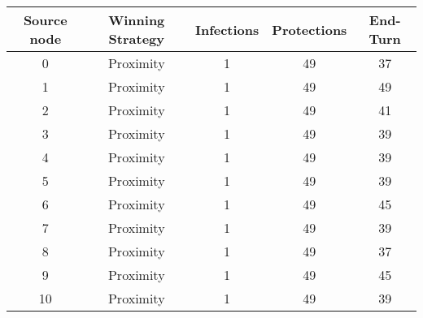 \documentclass[results.tex]{subfiles}
\begin{document}
    \begin{center}
        \begin{tabular}{| c || c | c | c | c |}
            \hline
            {\bfseries Source node} & {\bfseries Winning Strategy} & {\bfseries Infections} & {\bfseries Protections}
            & {\bfseries End-Turn}
            \\  %
            \hline\hline
            0                       & Proximity                    & 1                      & 49                      & 37                   \\
            \hline
            1                       & Proximity                    & 1                      & 49                      & 49                   \\
            \hline
            2                       & Proximity                    & 1                      & 49                      & 41                   \\
            \hline
            3                       & Proximity                    & 1                      & 49                      & 39                   \\
            \hline
            4                       & Proximity                    & 1                      & 49                      & 39                   \\
            \hline
            5                       & Proximity                    & 1                      & 49                      & 39                   \\
            \hline
            6                       & Proximity                    & 1                      & 49                      & 45                   \\
            \hline
            7                       & Proximity                    & 1                      & 49                      & 39                   \\
            \hline
            8                       & Proximity                    & 1                      & 49                      & 37                   \\
            \hline
            9                       & Proximity                    & 1                      & 49                      & 45                   \\
            \hline
            10                      & Proximity                    & 1                      & 49                      & 39                   \\

\end{tabular}
\end{center}
\end{document}
